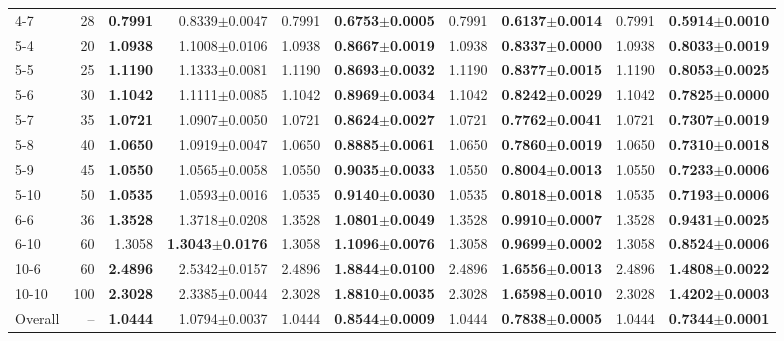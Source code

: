 \begin{table}[t]
{\begin{tabular}{lrrrrrrrrr}
    4-7 & 28 & \textbf{0.7991} & 0.8339$\pm$0.0047 & 0.7991 & \textbf{0.6753$\pm$0.0005} & 0.7991 & \textbf{0.6137$\pm$0.0014} & 0.7991 & \textbf{0.5914$\pm$0.0010} \\
    5-4 & 20 & \textbf{1.0938} & 1.1008$\pm$0.0106 & 1.0938 & \textbf{0.8667$\pm$0.0019} & 1.0938 & \textbf{0.8337$\pm$0.0000} & 1.0938 & \textbf{0.8033$\pm$0.0019} \\
    5-5 & 25 & \textbf{1.1190} & 1.1333$\pm$0.0081 & 1.1190 & \textbf{0.8693$\pm$0.0032} & 1.1190 & \textbf{0.8377$\pm$0.0015} & 1.1190 & \textbf{0.8053$\pm$0.0025} \\
    5-6 & 30 & \textbf{1.1042} & 1.1111$\pm$0.0085 & 1.1042 & \textbf{0.8969$\pm$0.0034} & 1.1042 & \textbf{0.8242$\pm$0.0029} & 1.1042 & \textbf{0.7825$\pm$0.0000} \\
    5-7 & 35 & \textbf{1.0721} & 1.0907$\pm$0.0050 & 1.0721 & \textbf{0.8624$\pm$0.0027} & 1.0721 & \textbf{0.7762$\pm$0.0041} & 1.0721 & \textbf{0.7307$\pm$0.0019} \\
    5-8 & 40 & \textbf{1.0650} & 1.0919$\pm$0.0047 & 1.0650 & \textbf{0.8885$\pm$0.0061} & 1.0650 & \textbf{0.7860$\pm$0.0019} & 1.0650 & \textbf{0.7310$\pm$0.0018} \\
    5-9 & 45 & \textbf{1.0550} & 1.0565$\pm$0.0058 & 1.0550 & \textbf{0.9035$\pm$0.0033} & 1.0550 & \textbf{0.8004$\pm$0.0013} & 1.0550 & \textbf{0.7233$\pm$0.0006} \\
    5-10 & 50 & \textbf{1.0535} & 1.0593$\pm$0.0016 & 1.0535 & \textbf{0.9140$\pm$0.0030} & 1.0535 & \textbf{0.8018$\pm$0.0018} & 1.0535 & \textbf{0.7193$\pm$0.0006} \\
    6-6 & 36 & \textbf{1.3528} & 1.3718$\pm$0.0208 & 1.3528 & \textbf{1.0801$\pm$0.0049} & 1.3528 & \textbf{0.9910$\pm$0.0007} & 1.3528 & \textbf{0.9431$\pm$0.0025} \\
    6-10 & 60 & 1.3058 & \textbf{1.3043$\pm$0.0176} & 1.3058 & \textbf{1.1096$\pm$0.0076} & 1.3058 & \textbf{0.9699$\pm$0.0002} & 1.3058 & \textbf{0.8524$\pm$0.0006} \\
    10-6 & 60 & \textbf{2.4896} & 2.5342$\pm$0.0157 & 2.4896 & \textbf{1.8844$\pm$0.0100} & 2.4896 & \textbf{1.6556$\pm$0.0013} & 2.4896 & \textbf{1.4808$\pm$0.0022} \\
    10-10 & 100 & \textbf{2.3028} & 2.3385$\pm$0.0044 & 2.3028 & \textbf{1.8810$\pm$0.0035} & 2.3028 & \textbf{1.6598$\pm$0.0010} & 2.3028 & \textbf{1.4202$\pm$0.0003} \\
    \midrule
    Overall & -- & \textbf{1.0444} & 1.0794$\pm$0.0037 & 1.0444 & \textbf{0.8544$\pm$0.0009} & 1.0444 & \textbf{0.7838$\pm$0.0005} & 1.0444 & \textbf{0.7344$\pm$0.0001} \\

\end{tabular}}
\end{table}
